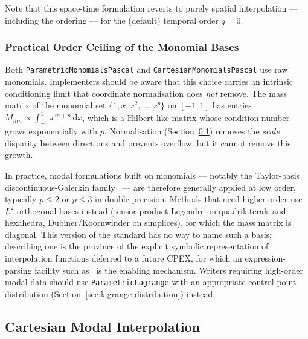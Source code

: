 \documentclass[11pt,letterpaper]{article}
\newenvironment{v2quote}
  {\begin{v2quoteframe}%
   \noindent{\footnotesize\sffamily\bfseries\color{cgnsblue}v2 text}%
   \nopagebreak\par\nopagebreak\vspace{0.15em}}
  {\end{v2quoteframe}}
\begin{document}
\begin{v2quote}
Note that this space-time formulation reverts to purely spatial interpolation --- including the
ordering --- for the (default) temporal order $q=0$.
\end{v2quote}

\subsubsection{Practical Order Ceiling of the Monomial Bases}
\label{sec:modal-order-ceiling}

Both \texttt{ParametricMonomialsPascal} and \texttt{CartesianMonomialsPascal} use raw
monomials.  Implementers should be aware that this choice carries an intrinsic
conditioning limit that coordinate normalisation does \emph{not} remove.  The mass
matrix of the monomial set $\{1, x, x^2, \ldots, x^p\}$ on $[-1,1]$ has entries
$M_{mn} \propto \int_{-1}^{1} x^{m+n}\,\mathrm{d}x$, which is a Hilbert-like matrix
whose condition number grows exponentially with $p$.  Normalisation
(Section~\ref{sec:cartesian-modal}) removes the \emph{scale} disparity between
directions and prevents overflow, but it cannot remove this growth.

In practice, modal formulations built on monomials --- notably the Taylor-basis
discontinuous-Galerkin family~\cite{LuoBaumLohner08,Kuzmin20} --- are therefore
generally applied at low order, typically $p \le 2$ or $p \le 3$ in double precision.
Methods that need higher order use $L^2$-orthogonal bases instead (tensor-product
Legendre on quadrilaterals and hexahedra, Dubiner/Koornwinder on simplices), for which
the mass matrix is diagonal.  This version of the standard has no way to name such a
basis; describing one is the province of the explicit symbolic representation of
interpolation functions deferred to a future CPEX, for which an expression-parsing
facility such as~\cite{Mathex} is the enabling mechanism.  Writers requiring
high-order modal data should use \texttt{ParametricLagrange} with an appropriate
control-point distribution (Section~\ref{sec:lagrange-distribution}) instead.

\subsection{Cartesian Modal Interpolation}
\label{sec:cartesian-modal}
\end{document}
